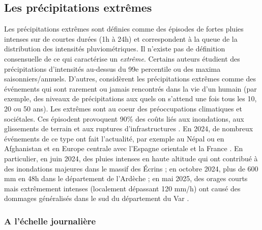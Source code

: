 \documentclass[
  article,
  nofooter,
  noheadings]{jss}
\begin{document}
\subsection{Les précipitations
extrêmes}\label{les-pruxe9cipitations-extruxeames}

Les précipitations extrêmes sont définies comme des épisodes de fortes
pluies intenses sur de courtes durées (1h à 24h) et correspondent à la
queue de la distribution des intensités pluviométriques. Il n'existe pas
de définition consensuelle de ce qui caractérise un \emph{extrême}.
Certains auteurs étudient des précipitations d'intensités au-dessus du
99e percentile ou des maxima saisonniers/annuels. D'autres, considèrent
les précipitations extrêmes comme des événements qui sont rarement ou
jamais rencontrés dans la vie d'un humain (par exemple, des niveaux de
précipitations aux quels on s'attend une fois tous les 10, 20 ou 50
ans). Les extrêmes sont au coeur des préoccupations climatiques et
sociétales. Ces épisodent provoquent 90\% des coûts liés aux
inondations, aux glissements de terrain et aux ruptures
d'infrastructures \citep{IPCC_2022_WGIII}. En 2024, de nombreux
événements de ce type ont fait l'actualité, par exemple au Népal ou en
Afghanistan et en Europe centrale avec l'Espagne orientale et la France
\citep{WMO2025}. En particulier, en juin 2024, des pluies intenses en
haute altitude qui ont contribué à des inondations majeures dans le
massif des Écrins \citep{Blanc2024} ; en octobre 2024, plus de 600 mm en
48h dans le département de l'Ardèche
\citep{MeteoFrance2024_episodesArdeches} ; en mai 2025, des orages
courts mais extrêmement intenses (localement dépassant 120 mm/h) ont
causé des dommages généralisés dans le sud du département du Var
\citep{MeteoFrance2025}.

\subsubsection{A l'échelle
journalière}\label{a-luxe9chelle-journaliuxe8re}
\end{document}
